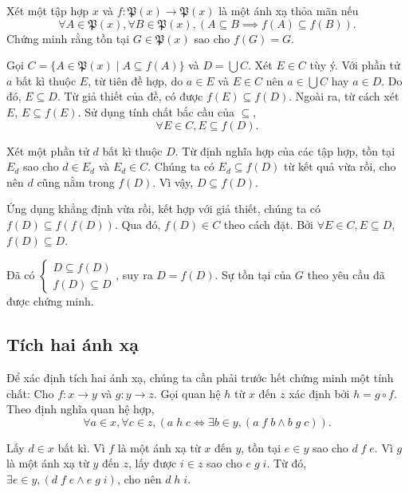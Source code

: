  Xét một tập hợp $x$ và $f: \mathfrak{P}(x) \to \mathfrak{P}(x)$ là một ánh xạ thỏa mãn nếu $$\forall A \in \mathfrak{P}(x), \forall B \in \mathfrak{P}(x), \left(A \subseteq B \implies f(A) \subseteq f(B)\right).$$ Chứng minh rằng tồn tại $G \in \mathfrak{P}(x)$ sao cho $f(G) = G$.


Gọi $C = \{A \in \mathfrak{P}(x) \mid A \subseteq f(A)\}$ và $D = \bigcup C$. Xét $E \in C$ tùy ý. Với phần tử $a$ bất kì thuộc $E$, từ tiên đề hợp, do $a \in E$ và $E \in C$ nên $a \in \bigcup C$ hay $a \in D$. Do đó, $E \subseteq D$. Từ giả thiết của đề, có được $f(E) \subseteq f(D)$. Ngoài ra, từ cách xét $E$, $E \subseteq f(E)$. Sử dụng tính chất bắc cầu của $\subseteq$, \begin{equation*}
   \forall E \in C, E \subseteq f(D).
\end{equation*}

Xét một phần tử $d$ bất kì thuộc $D$. Từ định nghĩa hợp của các tập hợp, tồn tại $E_d$ sao cho $d \in E_d$ và $E_d \in C$. Chúng ta có $E_d \subseteq f(D)$ từ kết quả vừa rồi, cho nên $d$ cũng nằm trong $f(D)$. Vì vậy, $D \subseteq f(D)$.

Ứng dụng khẳng định vừa rồi, kết hợp với giả thiết, chúng ta có $f(D) \subseteq f(f(D))$. Qua đó, $f(D) \in C$ theo cách đặt. Bởi $\forall E \in C, E \subseteq D$, $f(D) \subseteq D$.

Đã có $\begin{cases}
   D \subseteq f(D) \\
   f(D) \subseteq D
\end{cases}$, suy ra $D = f(D)$. Sự tồn tại của $G$ theo yêu cầu đã được chứng minh.

\subsection{Tích hai ánh xạ}

Để xác định tích hai ánh xạ, chúng ta cần phải trước hết chứng minh một tính chất: Cho $f:x \to y$ và $g: y \to z$. Gọi quan hệ $h$ từ $x$ đến $z$ xác định bởi $h = g \circ f$. Theo định nghĩa quan hệ hợp, 
\begin{equation*}
   \forall a \in x, \forall c \in z, (a\;h\;c \iff \exists b \in y, \left(a\;f\;b \land b\;g\;c\right)).
\end{equation*}

Lấy $d \in x$ bất kì. Vì $f$ là một ánh xạ từ $x$ đến $y$, tồn tại $e \in y$ sao cho $d\;f\;e$. Vì $g$ là một ánh xạ từ $y$ đến $z$, lấy được $i \in z$ sao cho $e\;g\;i$. Từ đó, $\exists e \in y, \left(d\;f\;e \land e\;g\;i\right)$, cho nên $d\;h\;i$. 

